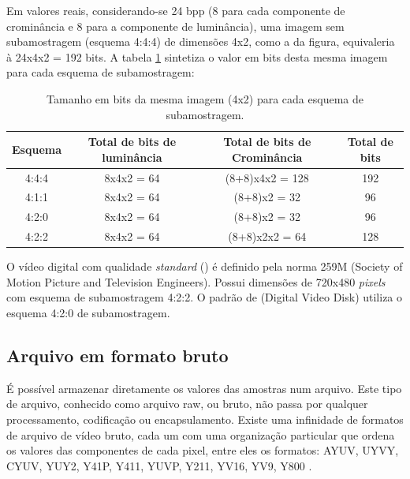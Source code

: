Em valores reais, considerando-se 24 bpp (8 para cada componente de crominância e 8 para a componente de luminância), uma imagem sem subamostragem (esquema 4:4:4) de dimensões 4x2, como a da figura, equivaleria à 24x4x2 = 192 bits. A tabela \ref{tab:subsampling}  sintetiza o valor em bits desta mesma imagem para cada esquema de subamostragem:

\begin{table}[!h]
	\centering
	\caption[Tamanho em bits para cada subamostragem]{Tamanho em bits da mesma imagem (4x2) para cada esquema de subamostragem.}
	\label{tab:subsampling}
	\begin{tabular}{|c|c|c|c|}
		\hline
		Esquema & Total de bits de luminância & Total de bits de Crominância & Total de bits \\
	    \hline
		4:4:4 & 8x4x2 = 64 & (8+8)x4x2 = 128 & 192 \\
	    \hline
		4:1:1 & 8x4x2 = 64 & (8+8)x2 = 32 & 96 \\
	    \hline
		4:2:0 & 8x4x2 = 64 & (8+8)x2 = 32 & 96 \\
	    \hline
		4:2:2 & 8x4x2 = 64 & (8+8)x2x2 = 64 & 128 \\
		\hline
	\end{tabular}
\end{table}

O vídeo digital com qualidade \emph{standard} () é definido pela norma  259M (Society of Motion Picture and Television Engineers). Possui dimensões de 720x480 \emph{pixels} com esquema de subamostragem 4:2:2. O padrão de  (Digital Video Disk) utiliza o esquema 4:2:0 de subamostragem.

\subsection{Arquivo em formato bruto}

É possível armazenar diretamente os valores das amostras num arquivo. Este tipo de arquivo, conhecido como arquivo raw, ou bruto, não passa por qualquer processamento, codificação ou encapsulamento. Existe uma infinidade de formatos de arquivo de vídeo bruto, cada um com uma organização particular que ordena os valores das componentes de cada pixel, entre eles os formatos: AYUV, UYVY, CYUV, YUY2, Y41P, Y411, YUVP, Y211, YV16, YV9, Y800 \cite{fourccyuv}. %

